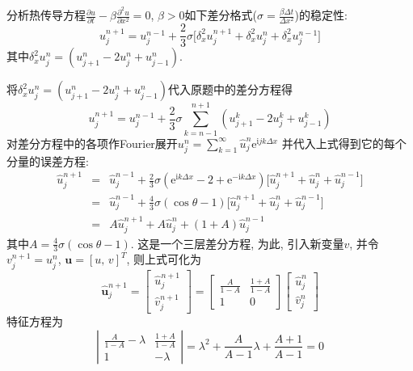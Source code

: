 \begin{problem}[问题6]
分析热传导方程$\frac{\partial u}{\partial t} - \beta\frac{\partial^2 u}{\partial x^2} = 0$, $\beta>0$如下差分格式($\sigma = \frac{\beta\Delta t}{\Delta x^2}$)的稳定性:
\[
u_j^{n+1} = u_j^{n-1} + \frac{2}{3}\sigma
\big[
\delta_x^2 u_j^{n+1} + \delta_x^2 u_j^n + \delta_x^2 u_j^{n-1}
\big]
\]
其中$\delta_x^2 u_j^n = (u_{j+1}^n - 2u_j^n + u_{j-1}^n)$.
\end{problem}

\begin{solution}
将$\delta_{x}^{2}u_{j}^{n}=(u_{j+1}^{n}-2u_{j}^{n}+u_{j-1}^{n})$代入原题中的差分方程得
\[
u_{j}^{n+1}=u_{j}^{n-1}+\frac{2}{3}\sigma\sum_{k=n-1}^{n+1}(u_{j+1}^{k}-2u_{j}^{k}+u_{j-1}^{k})
\]
对差分方程中的各项作Fourier展开$u_{j}^{n}=\sum_{k=1}^{\infty}\hat{u}_{j}^{n}\mathrm{e}^{\mathrm{i}jk\Delta x}$
并代入上式得到它的每个分量的误差方程:
{\setlength\arraycolsep{2pt}
\begin{eqnarray*}
\hat{u}_{j}^{n+1} & = & \hat{u}_{j}^{n-1}+\frac{2}{3}\sigma(\mathrm{e}^{\mathrm{i}k\Delta x}-2+\mathrm{e}^{-\mathrm{i}k\Delta x})\big[\hat{u}_{j}^{n+1}+\hat{u}_{j}^{n}+\hat{u}_{j}^{n-1}\big]\\
 & = & \hat{u}_{j}^{n-1}+\frac{4}{3}\sigma(\cos\theta-1)\big[\hat{u}_{j}^{n+1}+\hat{u}_{j}^{n}+\hat{u}_{j}^{n-1}\big]\\
 & = & A\hat{u}_{j}^{n+1}+A\hat{u}_{j}^{n}+(1+A)\hat{u}_{j}^{n-1}
\end{eqnarray*}}
其中$A=\frac{4}{3}\sigma(\cos\theta-1)$. 这是一个三层差分方程, 为此, 引入新变量$v$,
并令$v_{j}^{n+1}=u_{j}^{n}$, $\mathbf{u}=[u,\, v]^{T}$, 则上式可化为
\[
\hat{\mathbf{u}}_{j}^{n+1}=\left[\begin{array}{c}
\hat{u}_{j}^{n+1}\\
\hat{v}_{j}^{n+1}
\end{array}\right]=\left[\begin{array}{cc}
\frac{A}{1-A} & \frac{1+A}{1-A}\\
1 & 0
\end{array}\right]\left[\begin{array}{c}
\hat{u}_{j}^{n}\\
\hat{v}_{j}^{n}
\end{array}\right]
\]
特征方程为
\[
\left|\begin{array}{cc}
\frac{A}{1-A}-\lambda & \frac{1+A}{1-A}\\
1 & -\lambda
\end{array}\right|=\lambda^{2}+\frac{A}{A-1}\lambda+\frac{A+1}{A-1}=0
\]
\end{solution}
